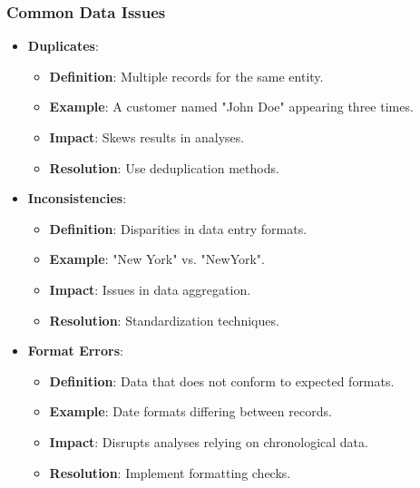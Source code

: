 \documentclass[aspectratio=169]{beamer}
\begin{document}
\begin{frame}[fragile]
    \frametitle{Common Data Issues}
    
    \begin{itemize}
        \item \textbf{Duplicates}:
        \begin{itemize}
            \item \textbf{Definition}: Multiple records for the same entity.
            \item \textbf{Example}: A customer named "John Doe" appearing three times.
            \item \textbf{Impact}: Skews results in analyses.
            \item \textbf{Resolution}: Use deduplication methods.
        \end{itemize}
        
        \item \textbf{Inconsistencies}:
        \begin{itemize}
            \item \textbf{Definition}: Disparities in data entry formats.
            \item \textbf{Example}: "New York" vs. "NewYork".
            \item \textbf{Impact}: Issues in data aggregation.
            \item \textbf{Resolution}: Standardization techniques.
        \end{itemize}
        
        \item \textbf{Format Errors}:
        \begin{itemize}
            \item \textbf{Definition}: Data that does not conform to expected formats.
            \item \textbf{Example}: Date formats differing between records.
            \item \textbf{Impact}: Disrupts analyses relying on chronological data.
            \item \textbf{Resolution}: Implement formatting checks.
        \end{itemize}
    \end{itemize}
\end{frame}
\end{document}

